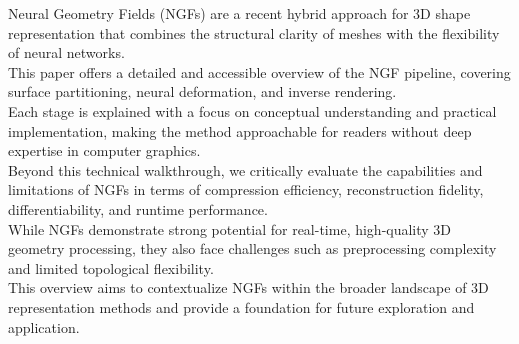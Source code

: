Neural Geometry Fields (NGFs) are a recent hybrid approach for 3D shape representation that combines the structural clarity of meshes with the flexibility of neural networks. \\
This paper offers a detailed and accessible overview of the NGF pipeline, covering surface partitioning, neural deformation, and inverse rendering. \\
Each stage is explained with a focus on conceptual understanding and practical implementation, making the method approachable for readers without deep expertise in computer graphics. \\
Beyond this technical walkthrough, we critically evaluate the capabilities and limitations of NGFs in terms of compression efficiency, reconstruction fidelity, differentiability, and runtime performance. \\
While NGFs demonstrate strong potential for real-time, high-quality 3D geometry processing, they also face challenges such as preprocessing complexity and limited topological flexibility. \\
This overview aims to contextualize NGFs within the broader landscape of 3D representation methods and provide a foundation for future exploration and application.
